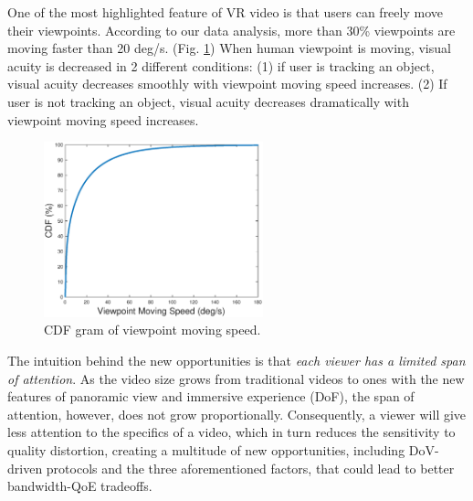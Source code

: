 One of the most highlighted feature of VR video is that users can freely move their viewpoints. According to our data analysis, more than 30\% viewpoints are moving faster than 20 deg/s. (Fig. \ref{CDFspeed}) 
When human viewpoint is moving, visual acuity is decreased in 2 different conditions: (1) if user is tracking an object, visual acuity decreases smoothly with viewpoint moving speed increases. (2) If user is not tracking an object, visual acuity decreases dramatically with viewpoint moving speed increases. \cite{speed}

\begin{figure}
  \centering
  \includegraphics[width=2.5in]{images/speed_CDF.eps}
  \caption{CDF gram of viewpoint moving speed.}
  \label{CDFspeed}
  \end{figure}




The intuition behind the new opportunities is that {\em each viewer has a limited span of attention}.
As the video size grows from traditional videos to \vr ones with the new features of panoramic view and immersive experience (\eg DoF), the span of attention, however, does not grow proportionally. 
Consequently, a viewer will give less attention to the specifics of a \vr video, which in turn reduces the sensitivity to quality distortion, creating a multitude of new opportunities, including DoV-driven protocols and the three aforementioned factors, that could lead to better bandwidth-QoE tradeoffs.



